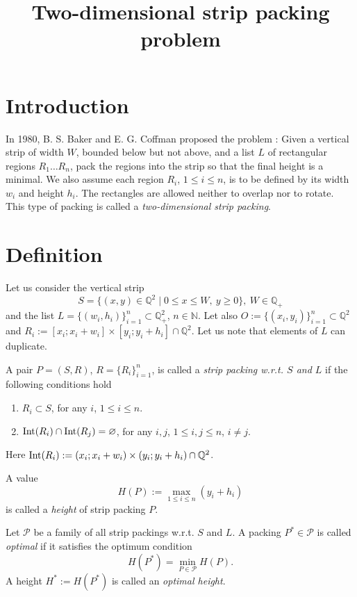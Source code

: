 \documentclass{article}
\title{Two-dimensional strip packing problem}
\date{}
\theoremstyle{definition}
\theoremstyle{theorem}
\numberwithin{proposition}{section}
\begin{document}
\maketitle
\section*{Introduction}
    In 1980, B. S. Baker and E. G. Coffman proposed the problem \cite{bakercoffmanrivest}: Given a vertical strip of width $W$, bounded below but not above, and a list $L$ of rectangular regions $R_1\dots R_n$, pack the regions into the strip so that the final height is a minimal. We also assume each region $R_i$, $1\leq i \leq n$, is to be defined by its width $w_i$ and height $h_i$. The rectangles are allowed neither to overlap nor to rotate. This type of packing is called a \textit{two-dimensional strip packing}.
\section*{Definition}
    Let us consider the vertical strip
    \begin{equation*}
        S=\{(x,y)\in\mathbb{Q}^2\mid0\leq x\leq W,~y\geq 0\},~W\in\mathbb{Q}_{+}
    \end{equation*}
    and the list $L=\{(w_i,h_i)\}^{n}_{i=1}\subset\mathbb{Q}^2_{+}$, $n\in\mathbb{N}$. Let also $O:=\{(x_i,y_i)\}_{i=1}^{n}\subset\mathbb{Q}^2$ and $R_i:=[x_i;x_i+w_i]\times[y_i;y_i+h_i]\cap\mathbb{Q}^2$. Let us note that elements of $L$ can duplicate. 

    A pair $P=(S,R)$, $R=\{R_i\}_{i=1}^{n}$, is called a \textit{strip packing w.r.t. $S$ and $L$} if the following conditions hold
    \begin{enumerate}
        \item
        $R_i\subset S$, for any $i$, $1\leq i\leq n$.
        \item
        ${\rm Int}(R_i)\cap{\rm Int}(R_j)=\varnothing$, for any $i,j$, $1\leq i,j\leq n$, $i\neq j$. 
    \end{enumerate} 
    Here ${\rm Int}(R_i):=(x_i;x_{i}+w_i)\times(y_i;y_i+h_i)\cap\mathbb{Q}^2$. 

    A value 
    \begin{equation*}
        H(P):=\max_{1\leq i\leq n}(y_i+h_i)
    \end{equation*}
    is called a \textit{height} of strip packing $P$.

    Let $\mathcal{P}$ be a family of all strip packings w.r.t. $S$ and $L$. A packing $P^{*}\in\mathcal{P}$ is called \textit{optimal} if it satisfies the optimum condition
    \begin{equation*}
        H(P^{*})=\min_{P\in\mathcal{P}}H(P).
    \end{equation*}
    A height $H^{*}:=H(P^{*})$ is called an \textit{optimal height}. 
\end{document}
